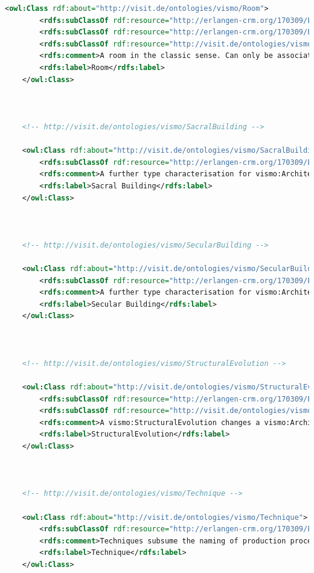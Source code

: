 \begin{lstlisting}[caption={VisMo Ontologie in der letzten (englischen) Version.},label={lst:vismo},captionpos=b,language=xml]
    <owl:Class rdf:about="http://visit.de/ontologies/vismo/Room">
        <rdfs:subClassOf rdf:resource="http://erlangen-crm.org/170309/E53_Place"/>
        <rdfs:subClassOf rdf:resource="http://erlangen-crm.org/170309/E84_Information_Carrier"/>
        <rdfs:subClassOf rdf:resource="http://visit.de/ontologies/vismo/Resource"/>
        <rdfs:comment>A room in the classic sense. Can only be associated with its vismo:Architecture entity that contains it.</rdfs:comment>
        <rdfs:label>Room</rdfs:label>
    </owl:Class>
    


    <!-- http://visit.de/ontologies/vismo/SacralBuilding -->

    <owl:Class rdf:about="http://visit.de/ontologies/vismo/SacralBuilding">
        <rdfs:subClassOf rdf:resource="http://erlangen-crm.org/170309/E55_Type"/>
        <rdfs:comment>A further type characterisation for vismo:Architecture entities, classifying them by a sacral type.</rdfs:comment>
        <rdfs:label>Sacral Building</rdfs:label>
    </owl:Class>
    


    <!-- http://visit.de/ontologies/vismo/SecularBuilding -->

    <owl:Class rdf:about="http://visit.de/ontologies/vismo/SecularBuilding">
        <rdfs:subClassOf rdf:resource="http://erlangen-crm.org/170309/E55_Type"/>
        <rdfs:comment>A further type characterisation for vismo:Architecture entities, classifying them by a secular type.</rdfs:comment>
        <rdfs:label>Secular Building</rdfs:label>
    </owl:Class>
    


    <!-- http://visit.de/ontologies/vismo/StructuralEvolution -->

    <owl:Class rdf:about="http://visit.de/ontologies/vismo/StructuralEvolution">
        <rdfs:subClassOf rdf:resource="http://erlangen-crm.org/170309/E11_Modification"/>
        <rdfs:subClassOf rdf:resource="http://visit.de/ontologies/vismo/Resource"/>
        <rdfs:comment>A vismo:StructuralEvolution changes a vismo:Architecture entity in some way. A change in its basic vismo:Function can thereby be established. For example a castle that changes from its military function to a museum.</rdfs:comment>
        <rdfs:label>StructuralEvolution</rdfs:label>
    </owl:Class>
    


    <!-- http://visit.de/ontologies/vismo/Technique -->

    <owl:Class rdf:about="http://visit.de/ontologies/vismo/Technique">
        <rdfs:subClassOf rdf:resource="http://erlangen-crm.org/170309/E55_Type"/>
        <rdfs:comment>Techniques subsume the naming of production processes, which have the result of producing an vismo:Object that are associated with the cultural heritage domain.</rdfs:comment>
        <rdfs:label>Technique</rdfs:label>
    </owl:Class>
    



\end{lstlisting}
